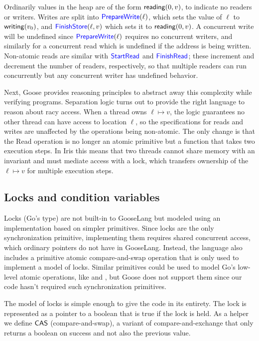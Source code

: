 Ordinarily values in the heap are of the form $\mathsf{reading}(0, v)$,
to indicate no readers or writers. Writes are split into
$\mathsf{\textcolor{blue}{PrepareWrite}}(\ell)$, which sets the value of $\ell$ to
$\mathsf{writing}(v_{0})$, and $\mathsf{\textcolor{blue}{FinishStore}}(\ell, v)$ which sets
it to $\mathsf{reading}(0, v)$. A concurrent write will be undefined
since $\mathsf{\textcolor{blue}{PrepareWrite}}(\ell)$ requires no concurrent writers, and
similarly for a concurrent read which is undefined if the address is being
written. Non-atomic reads are similar with $\mathsf{\textcolor{blue}{StartRead}}$ and
$\mathsf{\textcolor{blue}{FinishRead}}$; these increment and decrement the number of readers,
respectively, so that multiple readers can run concurrently but any concurrent
writer has undefined behavior.

Next, Goose provides reasoning principles to abstract away this complexity while
verifying programs. Separation logic turns out to provide the right
language to reason about racy access. When a thread owns
$\ell \mapsto v$, the logic guarantees no other thread can have access to location
$\ell$, so the specifications for reads and writes are unaffected by the
operations being non-atomic. The only change is that the
Read operation is no longer an atomic primitive but a function that
takes two execution steps. In Iris this means that two threads cannot
share memory with an invariant and must mediate access with a lock,
which transfers ownership of the $\ell \mapsto v$ for multiple execution
steps.

\subsection{Locks and condition variables}%
\label{sec:goose:locks}

\newcommand{\Acquire}{\goosedef{Acquire}}
\newcommand{\CAS}{\goosedef{CAS}}

Locks (Go's  type) are not built-in to GooseLang but modeled
using an implementation based on simpler primitives. Since locks are the
only synchronization primitive, implementing them requires shared
concurrent access, which ordinary pointers do not have in GooseLang.
Instead, the language also includes a primitive atomic compare-and-swap
operation that is only used to implement a model of locks. Similar primitives
could be used to model Go's low-level atomic operations, like
 and , but Goose does not
support them since our code hasn't required such synchronization primitives.

The model of locks is simple enough to give the code in its entirety. The lock
is represented as a pointer to a boolean that is true if the lock is held. As a
helper we define $\CAS$ (compare-and-swap), a variant of compare-and-exchange
that only returns a boolean on success and not also the previous value.

